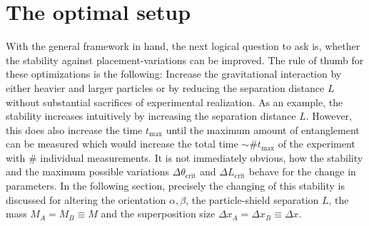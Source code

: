 \newpage
\section{The optimal setup}\label{sec:4:optimal-setup}
With the general framework in hand, the next logical question to ask is, whether the stability against placement-variations can be improved.
The rule of thumb for these optimizations is the following:
Increase the gravitational interaction by either heavier and larger particles or by reducing the separation distance $L$ without substantial sacrifices of experimental realization.
As an example, the stability increases intuitively by increasing the separation distance $L$. However, this does also increase the time $t_\mathrm{max}$ until the maximum amount of entanglement can be measured which would increase the total time  $\sim \# t_\mathrm{max}$ of the experiment with $\#$ individual measurements.
It is not immediately obvious, how the stability and the maximum possible variations $\Delta \theta_\mathrm{crit}$ and $\Delta L_\mathrm{crit}$ behave for the change in parameters.
In the following section, precisely the changing of this stability is discussed for altering the orientation $\alpha, \beta$, the particle-shield separation $L$, the mass $M_A = M_B \equiv M$ and the superposition size $\Delta x_A = \Delta x_B \equiv \Delta x$.

